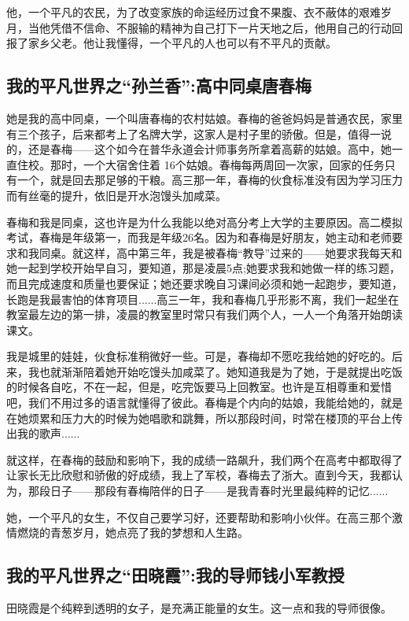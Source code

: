 \documentclass[openany,scheme = chinese, linespread = 1.5]{ctexbook}
\begin{document}
    他，一个平凡的农民，为了改变家族的命运经历过食不果腹、衣不蔽体的艰难岁月，当他凭借不信命、不服输的精神为自己打下一片天地之后，他用自己的行动回报了家乡父老。他让我懂得，一个平凡的人也可以有不平凡的贡献。 
    
\subsection*{我的平凡世界之“孙兰香”:高中同桌唐春梅}
    她是我的高中同桌，一个叫唐春梅的农村姑娘。春梅的爸爸妈妈是普通农民，家里有三个孩子，后来都考上了名牌大学，这家人是村子里的骄傲。但是，值得一说的，还是春梅——这个如今在普华永道会计师事务所拿着高薪的姑娘。高中，她一直住校。那时，一个大宿舍住着 16个姑娘。春梅每两周回一次家，回家的任务只有一个，就是回去那足够的干粮。高三那一年，春梅的伙食标准没有因为学习压力而有丝毫的提升，依旧是开水泡馒头加咸菜。 
    
    春梅和我是同桌，这也许是为什么我能以绝对高分考上大学的主要原因。高二模拟考试，春梅是年级第一，而我是年级26名。因为和春梅是好朋友，她主动和老师要求和我同桌。就这样，高中第三年，我是被春梅“教导”过来的——她要求我每天和她一起到学校开始早自习，要知道，那是凌晨5点;她要求我和她做一样的练习题，而且完成速度和质量也要保证；她还要求晚自习课间必须和她一起跑步，要知道，长跑是我最害怕的体育项目......高三一年，我和春梅几乎形影不离，我们一起坐在教室最左边的第一排，凌晨的教室里时常只有我们两个人，一人一个角落开始朗读课文。 
    
    我是城里的娃娃，伙食标准稍微好一些。可是，春梅却不愿吃我给她的好吃的。后来，我也就渐渐陪着她开始吃馒头加咸菜了。她知道我是为了她，于是就提出吃饭的时候各自吃，不在一起，但是，吃完饭要马上回教室。也许是互相尊重和爱惜吧，我们不用过多的语言就懂得了彼此。春梅是个内向的姑娘，我能给她的，就是在她烦累和压力大的时候为她唱歌和跳舞，所以那段时间，时常在楼顶的平台上传出我的歌声...... 
    
    就这样，在春梅的鼓励和影响下，我的成绩一路飙升，我们两个在高考中都取得了让家长无比欣慰和骄傲的好成绩，我上了军校，春梅去了浙大。直到今天，我都认为，那段日子——那段有春梅陪伴的日子——是我青春时光里最纯粹的记忆...... 
    
    她，一个平凡的女生，不仅自己要学习好，还要帮助和影响小伙伴。在高三那个激情燃烧的青葱岁月，她点亮了我的梦想和人生路。 
\subsection*{我的平凡世界之“田晓霞”:我的导师钱小军教授}

    田晓霞是个纯粹到透明的女子，是充满正能量的女生。这一点和我的导师很像。 
    
\end{document}

